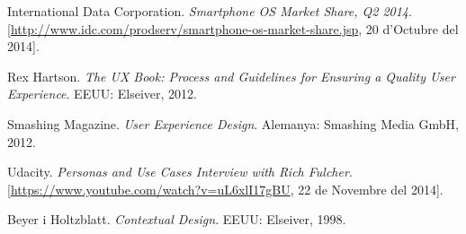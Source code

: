 \begin{thebibliography}{9}

International Data Corporation. \textit{Smartphone OS Market Share, Q2 2014}. [\url{http://www.idc.com/prodserv/smartphone-os-market-share.jsp}, 20 d'Octubre del 2014].

Rex Hartson. \textit{The UX Book: Process and Guidelines for Ensuring a Quality User Experience}. EEUU: Elseiver, 2012. %

Smashing Magazine. \textit{User Experience Design}. Alemanya: Smashing Media GmbH, 2012. %

Udacity. \textit{Personas and Use Cases Interview with Rich Fulcher}. [\url{https://www.youtube.com/watch?v=uL6xlI17gBU}, 22 de Novembre del 2014]. 

Beyer i Holtzblatt. \textit{Contextual Design}. EEUU: Elseiver, 1998.


\end{thebibliography}